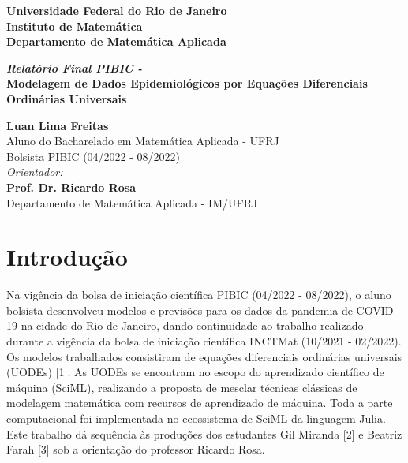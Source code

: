\documentclass[a4paper,12pt]{article}
\begin{document}
	

\vspace*{-1in}
\begin{center}
		
	\textbf{\normalsize Universidade Federal do Rio de Janeiro} \\
	\textbf{\small Instituto de Matemática} \\
	\textbf{\small Departamento de Matemática Aplicada} \\
	
	\vspace{1.5in}
	
	\doublespacing
	\textit{\textbf{\LARGE Relatório Final PIBIC -}} \\
	\textbf{\LARGE Modelagem de Dados Epidemiológicos por Equações Diferenciais Ordinárias Universais}
	
	\vspace{1.5in}
	
	\onehalfspacing
	\textbf{\Large Luan Lima Freitas} \\
	{\normalsize Aluno do Bacharelado em Matemática Aplicada - UFRJ} \\
	{\normalsize Bolsista PIBIC (04/2022 - 08/2022)} \\
	
	\vspace{0.5in}
	\textit{\large Orientador:} \\
	\textbf{\Large Prof. Dr. Ricardo Rosa} \\
	{\normalsize Departamento de Matemática Aplicada - IM/UFRJ}
\end{center}

\newpage
{}

\tableofcontents
\newpage

\section{Introdução}

Na vigência da bolsa de iniciação científica PIBIC (04/2022 - 08/2022), o aluno bolsista desenvolveu modelos e previsões para os dados da pandemia de COVID-19 na cidade do Rio de Janeiro, dando continuidade ao trabalho realizado durante a vigência da bolsa de iniciação científica INCTMat  (10/2021 - 02/2022). Os modelos trabalhados consistiram de equações diferenciais ordinárias universais (UODEs) [1]. As UODEs se encontram no escopo do aprendizado científico de máquina (SciML), realizando a proposta de mesclar técnicas clássicas de modelagem matemática com recursos de aprendizado de máquina. Toda a parte computacional foi implementada no ecossistema de SciML da linguagem Julia. Este trabalho dá sequência às produções dos estudantes Gil Miranda [2] e Beatriz Farah [3] sob a orientação do professor Ricardo Rosa.
\end{document}

